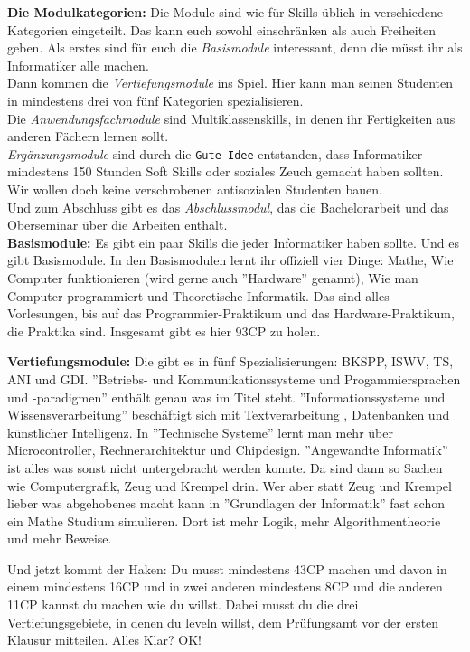 \textbf{Die Modulkategorien:}
Die Module sind wie f\"ur Skills \"ublich in verschiedene Kategorien
eingeteilt. Das kann euch sowohl einschr\"anken als auch Freiheiten geben.
Als erstes sind f\"ur euch die \emph{Basismodule} interessant, denn die m\"usst ihr als Informatiker alle machen.\\
Dann kommen die \emph{Vertiefungsmodule} ins Spiel. Hier kann man seinen Studenten in mindestens drei von f\"unf Kategorien spezialisieren.\\
Die \emph{Anwendungsfachmodule} sind Multiklassenskills, in denen ihr Fertigkeiten aus anderen F\"achern lernen sollt.\\
\emph{Erg\"anzungsmodule} sind durch die \texttt{Gute Idee\texttrademark} entstanden, dass Informatiker mindestens 150 Stunden Soft Skills oder soziales Zeuch gemacht haben sollten. Wir wollen doch keine verschrobenen antisozialen Studenten bauen.\\
Und zum Abschluss gibt es das \emph{Abschlussmodul}, das die Bachelorarbeit und das Oberseminar \"uber die Arbeiten enth\"alt.\\

\textbf{Basismodule:}
Es gibt ein paar Skills die jeder Informatiker haben sollte. Und es gibt
Basismodule. In den Basismodulen lernt ihr offiziell vier Dinge: Mathe, Wie
Computer funktionieren (wird gerne auch ''Hardware'' genannt), Wie man Computer
programmiert und Theoretische Informatik. Das sind alles Vorlesungen, bis auf
das Programmier-Praktikum und das Hardware-Praktikum, die Praktika sind.
Insgesamt gibt es hier 93CP zu holen.

\textbf{Vertiefungsmodule:}
Die gibt es in f\"unf Spezialisierungen: BKSPP, ISWV, TS, ANI und GDI. ''Betriebs-
und Kommunikationssysteme und Progammiersprachen und -paradigmen'' enth\"alt
genau was im Titel steht. ''Informationssysteme und Wissensverarbeitung''
besch\"aftigt sich mit Textverarbeitung , Datenbanken und k\"unstlicher
Intelligenz. In ''Technische Systeme'' lernt man mehr \"uber Microcontroller,
Rechnerarchitektur und Chipdesign. ''Angewandte Informatik'' ist alles was
sonst nicht untergebracht werden konnte. Da sind dann so Sachen wie
Computergrafik, Zeug und Krempel drin. Wer aber statt Zeug und Krempel lieber
was abgehobenes macht kann in ''Grundlagen der Informatik'' fast schon ein
Mathe Studium simulieren. Dort ist mehr Logik, mehr Algorithmentheorie und mehr
Beweise.

Und jetzt kommt der Haken: Du musst mindestens 43CP machen und davon in einem
mindestens 16CP und in zwei anderen mindestens 8CP und die anderen 11CP kannst
du machen wie du willst. Dabei musst du die drei Vertiefungsgebiete, in denen
du leveln willst, dem Pr\"ufungsamt vor der ersten Klausur mitteilen. Alles
Klar? OK!

